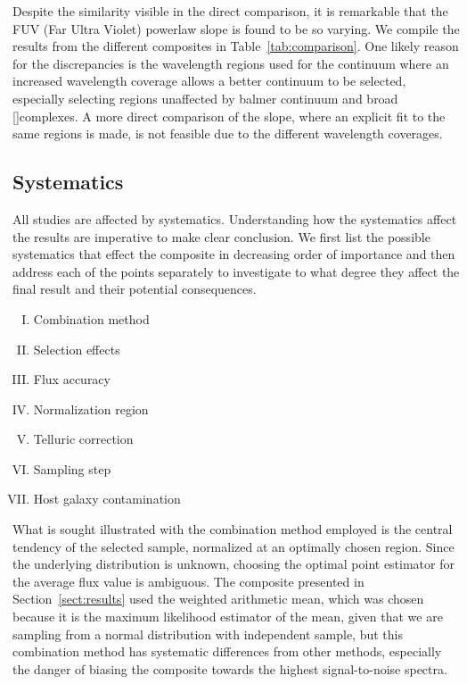 \documentclass{aa}    %
\newcommand{\Tab}[1]{Table~\ref{tab:#1}}
\newcommand{\tab}[1]{\Tab{#1}}
\newcommand{\tablabel}[1]{\label{tab:#1}}
\newcommand{\sectionname}{Section}
\newcommand{\Sect}[1]{\sectionname~\ref{sect:#1}}
\newcommand{\sect}[1]{\Sect{#1}}
\newcommand{\sectlabel}[1]{\label{sect:#1}}
\newcommand{\feii}{[\ion{Fe}{ii}]}
\begin{document}
  \tablabel{comparison}
 
Despite the similarity visible in the direct comparison, it is remarkable that the FUV (Far Ultra Violet) powerlaw slope is found to be so varying. We compile the results from the different composites in \tab{comparison}. One likely reason for the discrepancies is the wavelength regions used for the continuum where an increased wavelength coverage allows a better continuum to be selected, especially selecting regions unaffected by balmer continuum and broad \feii complexes. A more direct comparison of the slope, where an explicit fit to the same regions is made, is not feasible due to the different wavelength coverages. 





\subsection{Systematics}  \sectlabel{systematics}

All studies are affected by systematics. Understanding how the systematics affect the results are imperative to make clear conclusion. We first list the possible systematics that effect the composite in decreasing order of importance and then address each of the points separately to investigate to what degree they affect the final result and their potential consequences.


\begin{enumerate}[(I)]

	\item Combination method
	\item Selection effects
	\item Flux accuracy
	\item Normalization region
	\item Telluric correction
	\item Sampling step
	\item Host galaxy contamination
\end{enumerate}



What is sought illustrated with the combination method employed is the central tendency of the selected sample, normalized at an optimally chosen region. Since the underlying distribution is unknown, choosing the optimal point estimator for the average flux value is ambiguous. The composite presented in \sect{results} used the weighted arithmetic mean, which was chosen because it is the maximum likelihood estimator of the mean, given that we are sampling from a normal distribution with independent sample, but this combination method has systematic differences from other methods, especially the danger of biasing the composite towards the highest signal-to-noise spectra. 
\end{document}
